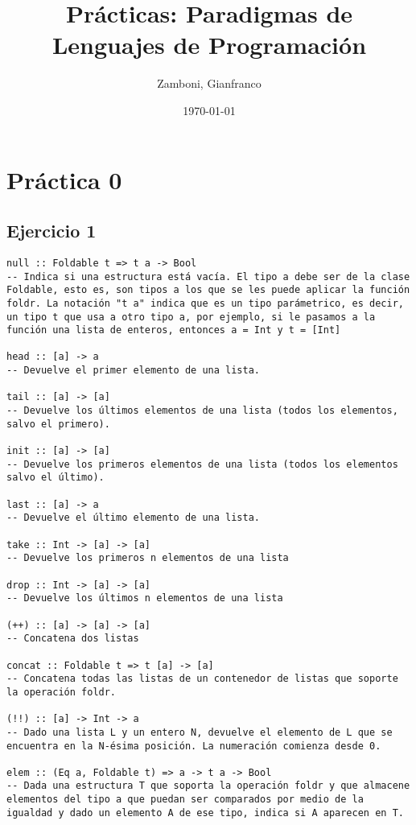 \documentclass[10pt,a4paper]{article}
\begin{document}
\title{Prácticas: Paradigmas de Lenguajes de Programación}

\date{\today}

\author{Zamboni, Gianfranco}

\maketitle
\tableofcontents

\newpage
\setcounter{page}{1}

\section{Práctica 0}

\subsection{Ejercicio 1}
\begin{centrado}
\begin{verbatim}
null :: Foldable t => t a -> Bool 
-- Indica si una estructura está vacía. El tipo a debe ser de la clase Foldable, esto es, son tipos a los que se les puede aplicar la función foldr. La notación "t a" indica que es un tipo parámetrico, es decir, un tipo t que usa a otro tipo a, por ejemplo, si le pasamos a la función una lista de enteros, entonces a = Int y t = [Int]

head :: [a] -> a
-- Devuelve el primer elemento de una lista.

tail :: [a] -> [a]
-- Devuelve los últimos elementos de una lista (todos los elementos, salvo el primero).

init :: [a] -> [a]
-- Devuelve los primeros elementos de una lista (todos los elementos salvo el último).

last :: [a] -> a
-- Devuelve el último elemento de una lista.

take :: Int -> [a] -> [a]
-- Devuelve los primeros n elementos de una lista

drop :: Int -> [a] -> [a]
-- Devuelve los últimos n elementos de una lista

(++) :: [a] -> [a] -> [a]
-- Concatena dos listas

concat :: Foldable t => t [a] -> [a]
-- Concatena todas las listas de un contenedor de listas que soporte la operación foldr.

(!!) :: [a] -> Int -> a
-- Dado una lista L y un entero N, devuelve el elemento de L que se encuentra en la N-ésima posición. La numeración comienza desde 0.

elem :: (Eq a, Foldable t) => a -> t a -> Bool
-- Dada una estructura T que soporta la operación foldr y que almacene elementos del tipo a que puedan ser comparados por medio de la igualdad y dado un elemento A de ese tipo, indica si A aparecen en T.

\end{verbatim}
\end{centrado}
\end{document}
